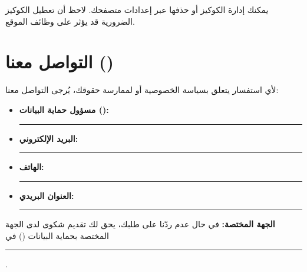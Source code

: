 \documentclass[12pt,a4paper]{article}
\begin{document}
\noindent يمكنك إدارة الكوكيز أو حذفها عبر إعدادات متصفحك. لاحظ أن تعطيل الكوكيز الضرورية قد يؤثر على وظائف الموقع.

\section{التواصل معنا ()}
\label{sec:contact}
لأي استفسار يتعلق بسياسة الخصوصية أو لممارسة حقوقك، يُرجى التواصل معنا:

\begin{itemize}
    \item \textbf{مسؤول حماية البيانات ():} \rule{6cm}{0.4pt}
    \item \textbf{البريد الإلكتروني:} \rule{6cm}{0.4pt}
    \item \textbf{الهاتف:} \rule{6cm}{0.4pt}
    \item \textbf{العنوان البريدي:} \rule{8cm}{0.4pt}
\end{itemize}

\medskip
\noindent\textbf{الجهة المختصة:} في حال عدم ردّنا على طلبك، يحق لك تقديم شكوى لدى الجهة المختصة بحماية البيانات () في \rule{4cm}{0.4pt}.
\end{document}
